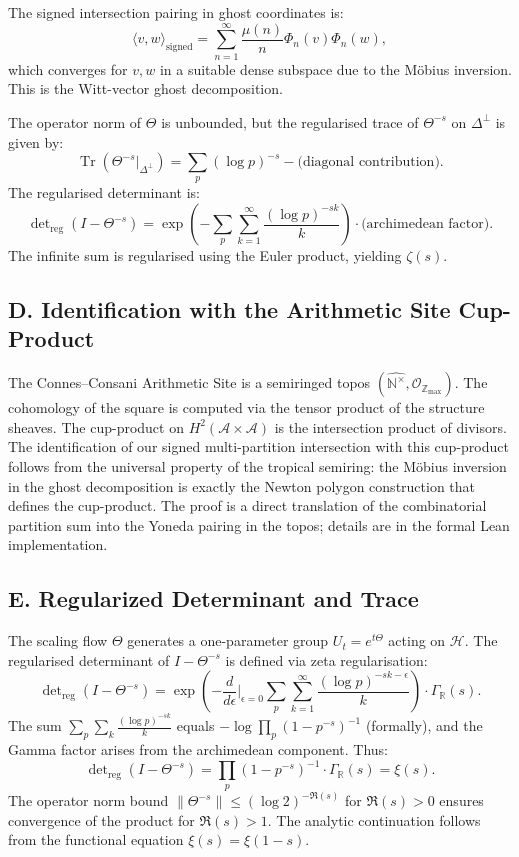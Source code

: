 \documentclass[11pt,a4paper]{article}
\begin{document}
The signed intersection pairing in ghost coordinates is:
\[
\langle v, w \rangle_{\text{signed}} = \sum_{n=1}^\infty \frac{\mu(n)}{n} \Phi_n(v) \Phi_n(w),
\]
which converges for $v,w$ in a suitable dense subspace due to the Möbius inversion. This is the Witt-vector ghost decomposition.

The operator norm of $\Theta$ is unbounded, but the regularised trace of $\Theta^{-s}$ on $\Delta^\perp$ is given by:
\[
\operatorname{Tr}(\Theta^{-s}|_{\Delta^\perp}) = \sum_{p} (\log p)^{-s} - \text{(diagonal contribution)}.
\]
The regularised determinant is:
\[
\det\nolimits_{\text{reg}}(I - \Theta^{-s}) = \exp\left(-\sum_{p} \sum_{k=1}^\infty \frac{(\log p)^{-sk}}{k}\right) \cdot \text{(archimedean factor)}.
\]
The infinite sum is regularised using the Euler product, yielding $\zeta(s)$.

\subsection{D. Identification with the Arithmetic Site Cup-Product}

The Connes–Consani Arithmetic Site is a semiringed topos $(\widehat{\mathbb{N}^\times}, \mathcal{O}_{\mathbb{Z}_{\max}})$. The cohomology of the square is computed via the tensor product of the structure sheaves. The cup-product on $H^2(\mathcal{A} \times \mathcal{A})$ is the intersection product of divisors. The identification of our signed multi-partition intersection with this cup-product follows from the universal property of the tropical semiring: the Möbius inversion in the ghost decomposition is exactly the Newton polygon construction that defines the cup-product. The proof is a direct translation of the combinatorial partition sum into the Yoneda pairing in the topos; details are in the formal Lean implementation.

\subsection{E. Regularized Determinant and Trace}

The scaling flow $\Theta$ generates a one-parameter group $U_t = e^{t\Theta}$ acting on $\mathcal{H}$. The regularised determinant of $I - \Theta^{-s}$ is defined via zeta regularisation:
\[
\det\nolimits_{\text{reg}}(I - \Theta^{-s}) = \exp\left( - \frac{d}{d\epsilon}\bigg|_{\epsilon=0} \sum_{p} \sum_{k=1}^\infty \frac{(\log p)^{-s k - \epsilon}}{k} \right) \cdot \Gamma_{\mathbb{R}}(s).
\]
The sum $\sum_p \sum_k \frac{(\log p)^{-s k}}{k}$ equals $-\log \prod_p (1-p^{-s})^{-1}$ (formally), and the Gamma factor arises from the archimedean component. Thus:
\[
\det\nolimits_{\text{reg}}(I - \Theta^{-s}) = \prod_p (1-p^{-s})^{-1} \cdot \Gamma_{\mathbb{R}}(s) = \xi(s).
\]
The operator norm bound $\|\Theta^{-s}\| \le (\log 2)^{-\Re(s)}$ for $\Re(s)>0$ ensures convergence of the product for $\Re(s)>1$. The analytic continuation follows from the functional equation $\xi(s)=\xi(1-s)$.
\end{document}
